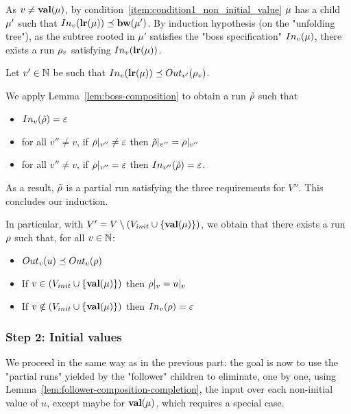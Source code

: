 	As $v \neq \valuelabel{\node}$, by condition~\ref{item:condition1_non_initial_value} $\node$ has a child $\node'$ such that $\vinput{v}{\localrunlabel{\mu}} \subword  \bosslabel{\node'}$.
	By induction hypothesis (on the "unfolding tree"), as the subtree rooted in $\mu'$ satisfies the "boss specification" $\vinput{v}{\mu}$, there exists a run $\run_v$ satisfying $\vinput{v}{\localrunlabel{\mu}}$.
	
	Let $v' \in \nats$ be such that $\vinput{v}{\localrunlabel{\node}} \subword \voutput{v'}{\run_v}$. 
	
	We apply Lemma~\ref{lem:boss-composition} to obtain a run $\Tilde{\run}$ such that 
		\begin{itemize}			
		\item $\vinput{v}{\Tilde{\run}} = \varepsilon$ 
		
		\item for all $v'' \neq v$, if $\vproj{v''}{\run} \neq \varepsilon$ then $\vproj{v''}{\Tilde{\run}} = \vproj{v''}{\run}$
		
		\item for all $v'' \neq v$, if $\vproj{v''}{\run} = \varepsilon$ then $\vinput{v''}{\Tilde{\run}} = \varepsilon$.
	\end{itemize}
	
	As a result, $\Tilde{\run}$ is a partial run satisfying the three requirements for $V''$.  This concludes our induction.
	
	In particular, with $V' = V\setminus (V_{init}\cup \set{\valuelabel{\node}})$, we obtain that there exists a run $\run$ such that,
	for all $v \in \nats$:
	\begin{itemize}
		\item $\voutput{v}{u} \subword \voutput{v}{\run}$
		
		\item If $v \in (V_{init}\cup \set{\valuelabel{\node}})$ then $\vproj{v}{\run} = \vproj{v}{u}$
		
		\item If $v \notin (V_{init}\cup \set{\valuelabel{\node}})$ then $\vinput{v}{\run} = \epsilon$
	\end{itemize}  
	
	\subsubsection{Step 2: Initial values}
	\label{sec:tree-to-run-step-two}
	
	We proceed in the same way as in the previous part: the goal is now to use the "partial runs" yielded by the "follower" children to eliminate, one by one, using Lemma~\ref{lem:follower-composition-completion}, the input over each non-initial value of $u$, except maybe for $\valuelabel{\node}$, which requires a special case.
	
